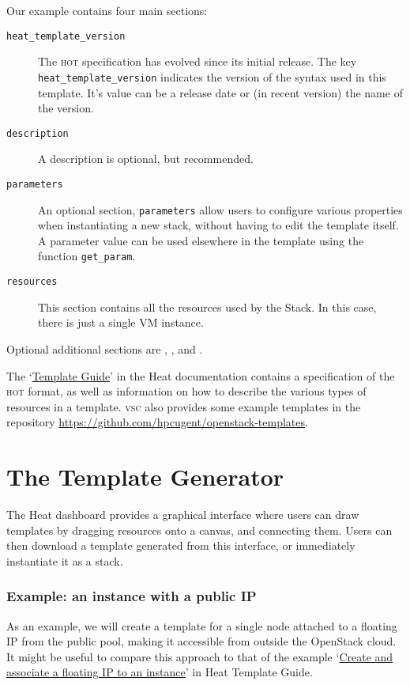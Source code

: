Our example contains four main sections:
\begin{description}
\item[\texttt{heat\_template\_version}] The \textsc{hot} specification
  has evolved since its initial release.  The key
  \lstinline{heat_template_version} indicates the version of the
  syntax used in this template.  It's value can be a release date or
  (in recent version) the name of the version.
\item[\texttt{description}] A description is optional, but
  recommended.
\item[\texttt{parameters}] An optional section, \lstinline{parameters}
  allow users to configure various properties when instantiating a new
  stack, without having to edit the template itself.  A parameter
  value can be used elsewhere in the template using the function
  \lstinline{get_param}.
\item[\texttt{resources}] This section contains all the resources used
  by the Stack.  In this case, there is just a single VM instance.
\end{description}
Optional additional sections are ,
, and .

The
`\href{https://docs.openstack.org/heat/\osversion/template_guide}{Template
  Guide}' in the Heat documentation contains a specification of the
\textsc{hot} format, as well as information on how to describe the
various types of resources in a template.  \textsc{vsc} also provides
some example templates in the repository
\url{https://github.com/hpcugent/openstack-templates}.

\section{The Template Generator}\label{sec:template-generator}
The Heat dashboard provides a graphical interface where users can draw
templates by dragging resources onto a canvas, and connecting them.
Users can then download a template generated from this interface, or
immediately instantiate it as a stack.

\subsubsection{Example: an instance with a public IP}
As an example, we will create a template for a single node attached to
a floating IP from the public pool, making it accessible from outside
the OpenStack cloud.  It might be useful to compare this approach to
that of the example
`\href{https://docs.openstack.org/heat/\osversion/template_guide/basic_resources.html#create-and-associate-a-floating-ip-to-an-instance}{Create
  and associate a floating IP to an instance}' in Heat Template Guide.

